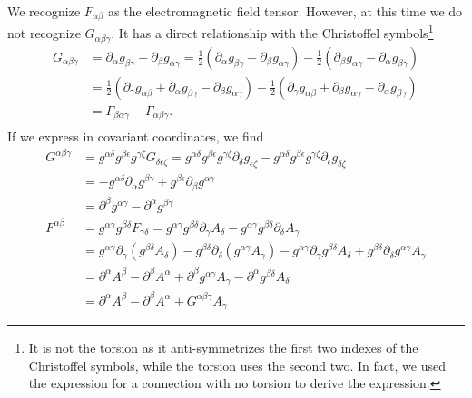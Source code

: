 We recognize $F_{\alpha\beta}$ as the electromagnetic field tensor. However, at this time we do not recognize $G_{\alpha\beta\gamma}$. It has a direct relationship with the Christoffel symbols\footnote{It is not the torsion as it anti-symmetrizes the first two indexes of the Christoffel symbols, while the torsion uses the second two. In fact, we used the expression for a connection with no torsion to derive the expression.}
\begin{equation}
	\begin{aligned}
		G_{\alpha\beta\gamma} &= \partial_\alpha g_{\beta \gamma} - \partial_\beta g_{\alpha \gamma} = \frac{1}{2} (\partial_\alpha g_{\beta \gamma} - \partial_\beta g_{\alpha \gamma}) - \frac{1}{2} (\partial_\beta g_{\alpha \gamma} - \partial_\alpha g_{\beta \gamma}) \\
		&= \frac{1}{2} (\partial_\gamma g_{\alpha \beta} + \partial_\alpha g_{\beta \gamma} - \partial_\beta g_{\alpha \gamma}) - \frac{1}{2} (\partial_\gamma g_{\alpha \beta} + \partial_\beta g_{\alpha \gamma} - \partial_\alpha g_{\beta \gamma}) \\
		&= \Gamma_{\beta\alpha\gamma} - \Gamma_{\alpha\beta\gamma}. \\
	\end{aligned}
\end{equation}
If we express in covariant coordinates, we find
\begin{equation}
	\begin{aligned}
		G^{\alpha\beta\gamma} &= g^{\alpha\delta}g^{\beta\epsilon}g^{\gamma\zeta} G_{\delta\epsilon\zeta} = g^{\alpha\delta}g^{\beta\epsilon}g^{\gamma\zeta} \partial_\delta g_{\epsilon\zeta} - g^{\alpha\delta}g^{\beta\epsilon}g^{\gamma\zeta} \partial_\epsilon g_{\delta\zeta}\\
		&= - g^{\alpha\delta} \partial_\alpha g^{\beta\gamma} + g^{\beta\epsilon} \partial_\beta g^{\alpha\gamma} \\
		&= \partial^\beta g^{\alpha\gamma} - \partial^\alpha g^{\beta\gamma} \\
		F^{\alpha\beta} &= g^{\alpha\gamma}g^{\beta\delta} F_{\gamma\delta} = g^{\alpha\gamma}g^{\beta\delta} \partial_\gamma A_{\delta} - g^{\alpha\gamma}g^{\beta\delta} \partial_\delta A_{\gamma}  \\
		&= g^{\alpha\gamma} \partial_\gamma (g^{\beta\delta} A_{\delta}) - g^{\beta\delta} \partial_\delta ( g^{\alpha\gamma}A_{\gamma}) - g^{\alpha\gamma} \partial_\gamma g^{\beta\delta} A_{\delta} + g^{\beta\delta} \partial_\delta g^{\alpha\gamma}A_{\gamma}\\
		&= \partial^\alpha A^\beta - \partial^\beta A^\alpha + \partial ^\beta g^{\alpha \gamma} A_\gamma - \partial^\alpha g^{\beta \delta} A_\delta\\
		&= \partial^\alpha A^\beta - \partial^\beta A^\alpha +G^{\alpha\beta\gamma} A_\gamma
	\end{aligned}
\end{equation}
